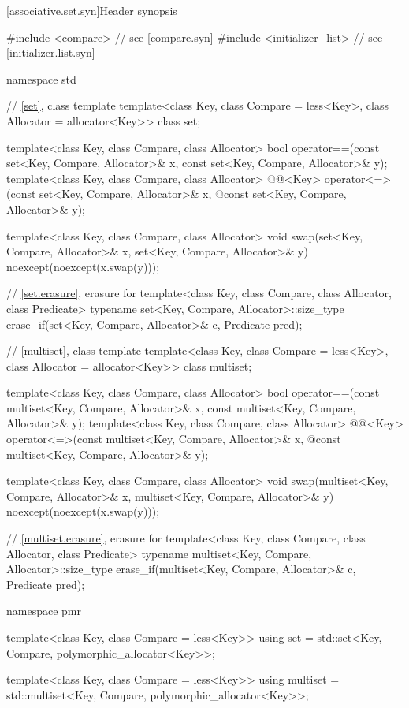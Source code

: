 [associative.set.syn]{Header  synopsis}%

%
\begin{codeblock}
#include <compare>              // see \ref{compare.syn}
#include <initializer_list>     // see \ref{initializer.list.syn}

namespace std {
  // \ref{set}, class template 
  template<class Key, class Compare = less<Key>, class Allocator = allocator<Key>>
    class set;

  template<class Key, class Compare, class Allocator>
    bool operator==(const set<Key, Compare, Allocator>& x,
                    const set<Key, Compare, Allocator>& y);
  template<class Key, class Compare, class Allocator>
    @@<Key> operator<=>(const set<Key, Compare, Allocator>& x,
    @\itcorr@                                        const set<Key, Compare, Allocator>& y);

  template<class Key, class Compare, class Allocator>
    void swap(set<Key, Compare, Allocator>& x,
              set<Key, Compare, Allocator>& y)
      noexcept(noexcept(x.swap(y)));

  // \ref{set.erasure}, erasure for 
  template<class Key, class Compare, class Allocator, class Predicate>
    typename set<Key, Compare, Allocator>::size_type
      erase_if(set<Key, Compare, Allocator>& c, Predicate pred);

  // \ref{multiset}, class template 
  template<class Key, class Compare = less<Key>, class Allocator = allocator<Key>>
    class multiset;

  template<class Key, class Compare, class Allocator>
    bool operator==(const multiset<Key, Compare, Allocator>& x,
                    const multiset<Key, Compare, Allocator>& y);
  template<class Key, class Compare, class Allocator>
    @@<Key> operator<=>(const multiset<Key, Compare, Allocator>& x,
    @\itcorr@                                        const multiset<Key, Compare, Allocator>& y);

  template<class Key, class Compare, class Allocator>
    void swap(multiset<Key, Compare, Allocator>& x,
              multiset<Key, Compare, Allocator>& y)
      noexcept(noexcept(x.swap(y)));

  // \ref{multiset.erasure}, erasure for 
  template<class Key, class Compare, class Allocator, class Predicate>
    typename multiset<Key, Compare, Allocator>::size_type
      erase_if(multiset<Key, Compare, Allocator>& c, Predicate pred);

  namespace pmr {
    template<class Key, class Compare = less<Key>>
      using set = std::set<Key, Compare, polymorphic_allocator<Key>>;

    template<class Key, class Compare = less<Key>>
      using multiset = std::multiset<Key, Compare, polymorphic_allocator<Key>>;
  }
}
\end{codeblock}


